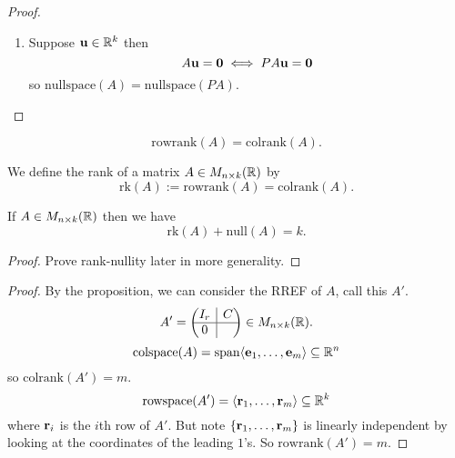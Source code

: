 \documentclass[10pt, a4paper]{article}
\begin{document}
\begin{proposition}
\begin{proof}
\begin{enumerate}[label = (\roman*)]
            Proof (claim)

            $\{P\mbf{v}_1, \dotsc, P\mbf{v}_r\}$ is certainly linearly independent
            (by last lemma).
            If $\mbf{v} \in PU$ then $\mbf{v} = P\mbf{u}$ for some $\mbf{u} + \lambda_1\mbf{v}_1 + \dotsi + \lambda_r\mbf{v}_r \in U$ so $\mbf{v} = P(\lambda_1\mbf{v}_1 + \dotsi + \lambda_r\mbf{v}_r) = \lambda_1P\mbf{v}_1 + \dotsi + \lambda_rP\mbf{v}_r$.
            So spanning.

            \item Suppose $\mathbf{u} \in \mathbb{R} ^ k$ then
            \[
            A\mathbf{u} = \mathbf{0} \iff PA\mathbf{u} = \mathbf{0}
            \]
            so $\mathrm{nullspace}(A) = \mathrm{nullspace}(PA)$.
        \end{enumerate}
    \end{proof}
\end{proposition}

\begin{theorem}\label{linalg:thm:rankthm}
    \[
    \mathrm{rowrank}(A) = \mathrm{colrank}(A).
    \]
\end{theorem}

\begin{definition}[Rank]
    We define the rank of a matrix $A \in M_{n \times k}(\mathbb{R})$ by
    \[
    \mathrm{rk}(A) := \mathrm{rowrank}(A) = \mathrm{colrank}(A).
    \]
\end{definition}

\begin{theorem}
    If $A \in M_{n \times k}(\mathbb{R})$ then we have
    \[
    \mathrm{rk}(A) + \mathrm{null}(A) = k.
    \]
    \begin{proof}
        Prove rank-nullity later in more generality.
    \end{proof}
\end{theorem}

\begin{theorem}[continues = linalg:thm:rankthm]
    \begin{proof}
        By the proposition,
        we can consider the RREF of $A$,
        call this $A'$.
        \[
        A' = \left(\hspace{-5pt}
        \begin{array}{c|c}
            I_r & C \\
            \hline
            0
        \end{array}
        \hspace{-5pt}\right) \in M_{n \times k}(\mathbb{R}).
        \]
        \[
        \mathrm{colspace}(A) = \mathrm{span}\langle\mathbf{e}_1, \dotsc, \mathbf{e}_m\rangle \subseteq \mathbb{R} ^ n
        \]
        so $\mathrm{colrank}(A') = m$.
        \[
        \mathrm{rowspace}(A') = \langle\mathbf{r}_1, \dotsc, \mathbf{r}_m\rangle \subseteq \mathbb{R} ^ k
        \]
        where $\mathbf{r}_i$ is the $i$th row of $A'$.
        But note $\{\mathbf{r}_1, \dotsc, \mathbf{r}_m\}$ is linearly independent by looking at the coordinates of the leading $1$'s.
        So $\mathrm{rowrank}(A') = m$.
    \end{proof}
\end{theorem}
\end{document}
